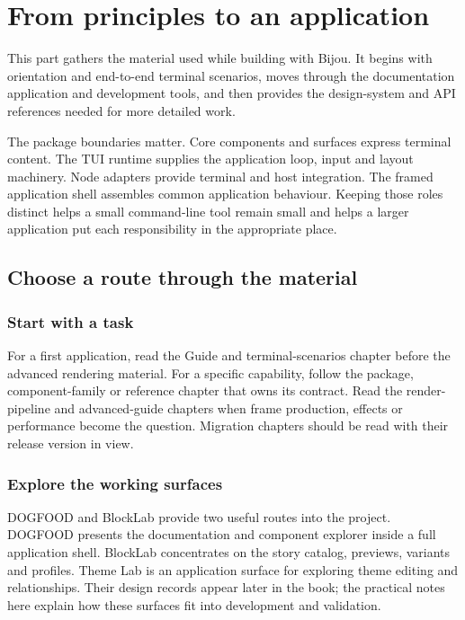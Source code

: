 \chapter*{From principles to an application}

This part gathers the material used while building with Bijou. It begins with orientation and end-to-end terminal scenarios, moves through the documentation application and development tools, and then provides the design-system and API references needed for more detailed work.

The package boundaries matter. Core components and surfaces express terminal content. The TUI runtime supplies the application loop, input and layout machinery. Node adapters provide terminal and host integration. The framed application shell assembles common application behaviour. Keeping those roles distinct helps a small command-line tool remain small and helps a larger application put each responsibility in the appropriate place.

\section*{Choose a route through the material}

\subsection*{Start with a task}

For a first application, read the Guide and terminal-scenarios chapter before the advanced rendering material. For a specific capability, follow the package, component-family or reference chapter that owns its contract. Read the render-pipeline and advanced-guide chapters when frame production, effects or performance become the question. Migration chapters should be read with their release version in view.

\subsection*{Explore the working surfaces}

DOGFOOD and BlockLab provide two useful routes into the project. DOGFOOD presents the documentation and component explorer inside a full application shell. BlockLab concentrates on the story catalog, previews, variants and profiles. Theme Lab is an application surface for exploring theme editing and relationships. Their design records appear later in the book; the practical notes here explain how these surfaces fit into development and validation.

